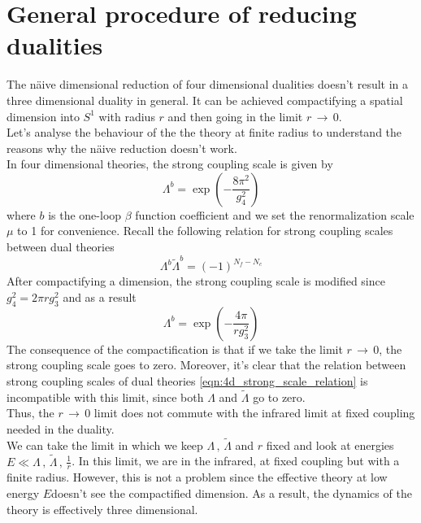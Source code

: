 \section{General procedure of reducing dualities}
The n{\"a}ive dimensional reduction of four dimensional dualities doesn't result in a three dimensional duality in general.
It can be achieved compactifying a spatial dimension into $S^1$ with radius $r$ and then going in the limit $r \, \rightarrow \, 0$. \\
Let's analyse the behaviour of the the theory at finite radius to understand the reasons why the n\"aive reduction doesn't work.\\
In four dimensional theories, the strong coupling scale is given by
\begin{equation}
 \Lambda^{b} = \exp{ \left(  - \frac{8 \pi^2}{g_4^2}\right)}
 \end{equation} 
where $b$ is the one-loop $\beta$ function coefficient and we set the renormalization scale $\mu$ to 1 for convenience.
Recall the following relation for strong coupling scales between dual theories 
\begin{equation}
  \Lambda^{b}  \tilde{\Lambda}^{b} = (-1)^{N_f - N_c}
  \label{eqn:4d_strong_scale_relation}
\end{equation}
After compactifying a dimension, the strong coupling scale is modified \cite{Aharony:2013dha} since  $g_4^2 =  2 \pi r g_3^2$ and as a result
\begin{equation}
  \Lambda^{b} = \exp{ \left(  - \frac{4 \pi}{ r g_3^2}\right)}
\end{equation}
The consequence of the compactification is that if we take the limit $r \, \rightarrow \, 0$,
the strong coupling scale goes to zero.
Moreover, it's clear that the relation between strong coupling scales of dual theories \eqref{eqn:4d_strong_scale_relation} is incompatible with this limit, since both $\Lambda $ and $ \tilde{\Lambda} $ go to zero.\\
Thus, the $r \, \rightarrow \, 0$ limit does not commute with the infrared limit at fixed coupling needed in the duality.\\
We can take the limit in which we keep $\Lambda \, , \, \tilde{\Lambda}$ and $r$ fixed and look at energies $E \ll \Lambda \, , \, \tilde{\Lambda} \,, \, \frac{1}{r}$. 
In this limit, we are in the infrared, at fixed coupling but with a finite radius.
However, this is not a problem since the effective theory at low energy $E$doesn't see the compactified dimension.
As a result, the dynamics of the theory is effectively three dimensional.\\
